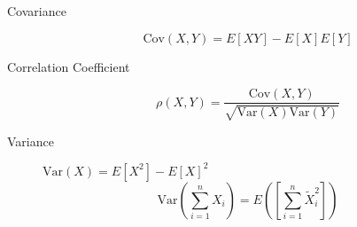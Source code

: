\documentclass[8pt]{article}
\begin{document}

\begin{multicols}{2}
  \begin{description}
  \item[Covariance] $$\text{Cov}(X,Y)=E[XY]-E[X]E[Y]$$
  \item[Correlation Coefficient]
    $$\rho(X,Y)=\frac{\text{Cov}(X,Y)}{\sqrt{\text{Var}(X)\text{Var}(Y)}}$$
  \item[Variance] $\text{Var}(X) = E[X^2] - E[X]^2$
    $$\text{Var}\left(\sum_{i=1}^{n}X_i\right) = E\left(\left[\sum_{i=1}^{n}\tilde{X}_i^2\right]\right)$$
  \end{description}
\end{multicols}
\end{document}
